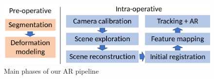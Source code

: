 \begin{figure}[t]
	\centering
	\includegraphics[width=0.8\columnwidth]{./figs/overview.png}
	\caption{Main phases of our AR pipeline}
	\label{fig:processOverview}
\end{figure}





